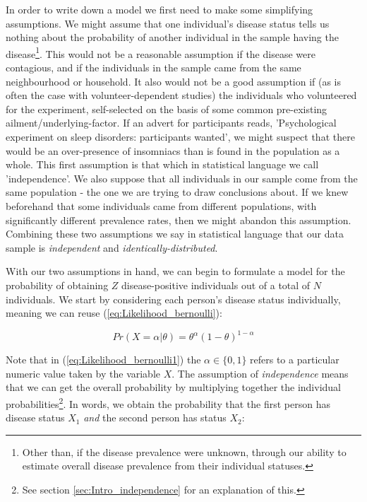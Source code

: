 \documentclass[11pt,fullpage]{book}
\begin{document}
In order to write down a model we first need to make some simplifying assumptions. We might assume that one individual's disease status tells us nothing about the probability of another individual in the sample having the disease\footnote{Other than, if the disease prevalence were unknown, through our ability to estimate overall disease prevalence from their individual statuses.}. This would not be a reasonable assumption if the disease were contagious, and if the individuals in the sample came from the same neighbourhood or household. It also would not be a good assumption if (as is often the case with volunteer-dependent studies) the individuals who volunteered for the experiment, self-selected on the basis of some common pre-existing ailment/underlying-factor. If an advert for participants reads, 'Psychological experiment on sleep disorders: participants wanted', we might suspect that there would be an over-presence of insomniacs than is found in the population as a whole. This first assumption is that which in statistical language we call 'independence'. We also suppose that all individuals in our sample come from the same population - the one we are trying to draw conclusions about. If we knew beforehand that some individuals came from different populations, with significantly different prevalence rates, then we might abandon this assumption. Combining these two assumptions we say in statistical language that our data sample is \textit{independent} and \textit{identically-distributed}.

With our two assumptions in hand, we can begin to formulate a model for the probability of obtaining $Z$ disease-positive individuals out of a total of $N$ individuals. We start by considering each person's disease status individually, meaning we can reuse (\ref{eq:Likelihood_bernoulli}):

\begin{equation}\label{eq:Likelihood_bernoulli1}
Pr(X=\alpha|\theta) = \theta^\alpha(1-\theta)^{1-\alpha}
\end{equation}

Note that in (\ref{eq:Likelihood_bernoulli1}) the $\alpha\in\{0,1\}$ refers to a particular numeric value taken by the variable $X$. The assumption of \textit{independence} means that we can get the overall probability by multiplying together the individual probabilities\footnote{See section \ref{sec:Intro_independence} for an explanation of this.}. In words, we obtain the probability that the first person has disease status $X_1$ \textit{and} the second person has status $X_2$:
\end{document}
